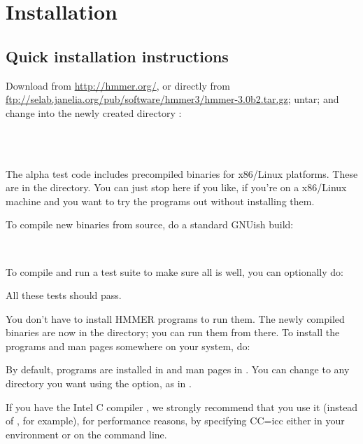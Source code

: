\section{Installation}
\label{section:installation}

\subsection{Quick installation instructions}

Download  from
\url{http://hmmer.org/}, or directly from
\url{ftp://selab.janelia.org/pub/software/hmmer3/hmmer-3.0b2.tar.gz};
untar; and change into the newly created directory :

\\
\\

The alpha test code includes precompiled binaries for x86/Linux
platforms. These are in the  directory. You can just
stop here if you like, if you're on a x86/Linux machine and you want
to try the programs out without installing them.

To compile new binaries from source, do a standard GNUish build:

\\ 

To compile and run a test suite to make sure all is well, you can
optionally do:


All these tests should pass.

You don't have to install HMMER programs to run them. The newly
compiled binaries are now in the  directory; you can run
them from there. To install the programs and man pages somewhere on
your system, do:


By default, programs are installed in  and man
pages in . You can change 
to any directory you want using the 
option, as in .

If you have the Intel C compiler , we strongly recommend
that you use it (instead of , for example), for performance
reasons, by specifying {CC=icc} either in your environment or on the
 command line. 

